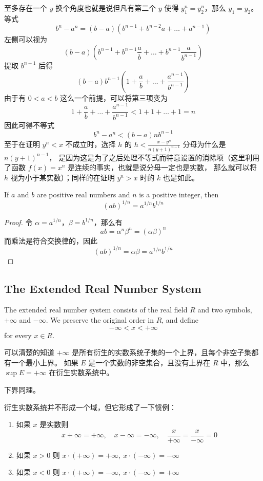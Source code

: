 \documentclass[../poma-notes.tex]{subfiles}
\begin{document}
\begin{anote}
	至多存在一个 $y$ 换个角度也就是说但凡有第二个 $y$ 使得 $y^n_1 = y^n_2$，那么 $y_1 = y_2$。\\
	等式
	\[b^n - a^n = (b-a)(b^{n-1} + b^{n-2}a + \dots + a^{n-1})\]
	左侧可以视为
	\[(b-a)(b^{n-1} + b^{n-1}\frac{a}{b} + \dots + b^{n-1}\frac{a}{b^{n-1}})\]
	提取 $b^{n-1}$ 后得
	\[(b-a)b^{n-1}(1 + \frac{a}{b} + \dots + \frac{a^{n-1}}{b^{n-1}})\]
	由于有 $0<a<b$ 这么一个前提，可以将第三项变为
	\[1 + \frac{a}{b} + \dots + \frac{a^{n-1}}{b^{n-1}} < 1 + 1 + \dots + 1 = n\]
	因此可得不等式
	\[b^n - a^n < (b-a)nb^{n-1}\]
	至于在证明 $y^n < x$ 不成立时，选择 $h$ 的 $h<\frac{x-y^n}{n(y+1)^{n-1}}$ 分母为什么是 $n(y+1)^{n-1}$，
	是因为这是为了之后处理不等式而特意设置的消除项（这里利用了函数 $f(x)=x^n$ 是连续的事实，也就是说分母一定也是实数，
	那么就可以将 $h$ 视为小于某实数）；同样的在证明 $y^n > x$ 时的 $k$ 也是如此。
\end{anote}

\begin{corollary}
	If $a$ and $b$ are positive real numbers and $n$ is a positive integer, then
	\[(ab)^{1/n} = a^{1/n}b^{1/n}\]
\end{corollary}

\begin{proof}
	令 $\alpha = a^{1/n}$，$\beta = b^{1/n}$，那么有
	\[ab = \alpha^n \beta^n = (\alpha\beta)^n\]
	而乘法是符合交换律的，因此
	\[(ab)^{1/n} = \alpha\beta = a^{1/n}b^{1/n}\]
\end{proof}

\subsection*{The Extended Real Number System}

\setcounter{poma}{22}
\begin{definition}
	The extended real number system consists of the real field $R$ and two symbols, $+\infty$ and $-\infty$.
	We preserve the original order in $R$, and define
	\[-\infty < x < +\infty\]
	for every $x \in R$.
\end{definition}

可以清楚的知道 $+\infty$ 是所有衍生的实数系统子集的一个上界，且每个非空子集都有一个最小上界。
如果 $E$ 是一个实数的非空集合，且没有上界在 $R$ 中，那么 $\sup E = + \infty$ 在衍生实数系统中。

下界同理。

衍生实数系统并不形成一个域，但它形成了一下惯例：

\begin{enumerate}[label=(\alph*)]
	\item 如果 $x$ 是实数则
	      \[x+\infty=+\infty,\quad x-\infty=-\infty,\quad \frac{x}{+\infty}=\frac{x}{-\infty}=0\]
	\item 如果 $x>0$ 则 $x \cdot (+\infty) = +\infty,\ x \cdot (-\infty) = -\infty$
	\item 如果 $x<0$ 则 $x \cdot (+\infty) = -\infty,\ x \cdot (-\infty) = +\infty$
\end{enumerate}
\end{document}
